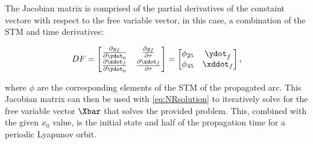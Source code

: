 The Jacobian matrix is comprised of the partial derivatives of the constaint vectore with respect
to the free variable vector, in this case, a combination of the STM and time derivatives:

\begin{equation}
    DF=\begin{bmatrix}  \frac{\partial y_{f}}{\partial\ydot_{0}}        &   \frac{\partial y_{f}}{\partial\tau}     \\
                        \frac{\partial\xdot_{f}}{\partial{\ydot_{0}}}   &   \frac{\partial\xdot_{f}}{\partial\tau}  \end{bmatrix}
      =\begin{bmatrix}  \phi_{25}                                       &   \ydot_{f}                               \\
                        \phi_{45}                                       &   \xddot_{f}                              \end{bmatrix},
\end{equation}

where $\phi$ are the corresponding elements of the STM of the propagated arc. This Jacobian matrix
can then be used with \cref{eq:NRsolution} to iteratively solve for the free variable vector
$\Xbar$ that solves the provided problem. This, combined with the given $x_{0}$ value, is the
initial state and half of the propagation time for a periodic Lyapunov orbit.
